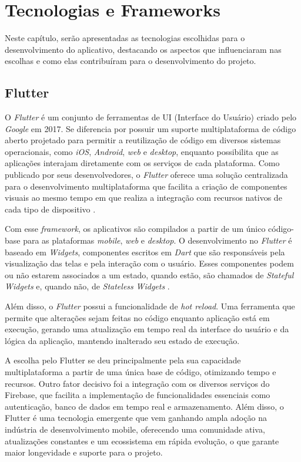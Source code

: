\chapter{Tecnologias e Frameworks}\label{tecnologias}

Neste capítulo, serão apresentadas as tecnologias escolhidas para o desenvolvimento do aplicativo, destacando os aspectos que influenciaram nas escolhas e como elas contribuíram para o desenvolvimento do projeto.

\section{Flutter}

O \textit{Flutter} é um conjunto de ferramentas de UI (Interface do Usuário) criado 
pelo \textit{Google} em 2017. Se diferencia por possuir um suporte multiplataforma de código aberto 
projetado para permitir a reutilização de código em diversos sistemas operacionais, como \textit{iOS}, 
\textit{Android}, \textit{web} e \textit{desktop}, enquanto possibilita que as aplicações interajam 
diretamente com os serviços de cada plataforma. Como publicado por seus desenvolvedores, 
o \textit{Flutter} oferece 
uma solução centralizada para o desenvolvimento multiplataforma que facilita a criação de 
componentes visuais ao mesmo tempo em que realiza a integração com recursos nativos de cada tipo 
de dispositivo \cite{flutterDocs2025}.

Com esse \textit{framework}, os aplicativos são compilados a partir de um único código-base para as 
plataformas \textit{mobile}, \textit{web} e \textit{desktop}. O desenvolvimento no \textit{Flutter} é baseado em \textit{Widgets}, 
componentes escritos em \textit{Dart} que são responsáveis pela visualização das telas e pela interação 
com o usuário.
Esses componentes podem ou não estarem associados a um estado, quando estão, são chamados de \textit{Stateful} 
\textit{Widgets} e, quando não, de \textit{Stateless} \textit{Widgets} \cite{flutterDocs2025}.

Além disso, o \textit{Flutter} possui a funcionalidade de \textit{hot reload}. 
Uma ferramenta que permite que alterações sejam feitas no código 
enquanto aplicação está em execução, gerando uma 
atualização em tempo real da interface do usuário e da lógica da aplicação, 
mantendo inalterado seu estado de execução.

A escolha pelo Flutter se deu principalmente pela sua capacidade multiplataforma a partir de 
uma única base de código, otimizando tempo e recursos. Outro fator decisivo foi a integração com os 
diversos serviços do Firebase, que facilita a implementação de funcionalidades essenciais 
como autenticação, banco de dados em tempo real e armazenamento. 
Além disso, o Flutter é uma tecnologia emergente que vem ganhando ampla adoção na 
indústria de desenvolvimento mobile, oferecendo uma comunidade ativa, atualizações constantes 
e um ecossistema em rápida evolução, o que garante maior longevidade e suporte para o projeto.

